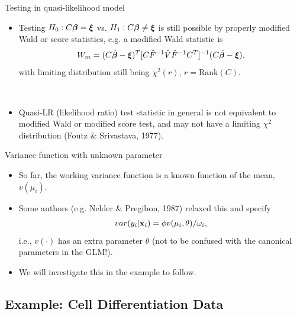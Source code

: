 \documentclass{beamer}
\newcommand{\currentsubsection}{}
\let\oldsubsection\subsection
\renewcommand{\subsection}[1]{\oldsubsection{#1}\renewcommand{\currentsubsection}{#1}}
\newcommand{\boldbeta}{{\boldsymbol \beta}}
\newenvironment{wideitemize}%
  {\begin{itemize}%
    \setlength{\parskip}{1em}}%
  {\end{itemize}}
\begin{document}
\begin{frame} {Testing in  quasi-likelihood model}
\begin{itemize}

\item
Testing $H_0: C\mbox{\boldmath $\beta$}=\mbox{\boldmath $\xi$}$ vs. $H_1:C\mbox{\boldmath $\beta$}
\neq \mbox{\boldmath $\xi$}$ is still possible by properly modified Wald or score statistics, e.g. a modified
Wald statistic is 
$$W_m=(C\hat{\boldbeta}-\mbox{\boldmath $\xi$})^T[C
\hat{F}^{-1}\hat{V}\hat{F}^{-1}C^T]^{-1}
(C\hat{\boldbeta}-\mbox{\boldmath $\xi$}),$$
with limiting distribution still being $\chi^2(r)$, $r=\mbox{Rank}(C)$.

\ \

\item
Quasi-LR (likelihood ratio) test statistic in general is not equivalent to modified Wald or modified
score test, and may not have a limiting $\chi^2$ distribution (Foutz \& Srivastava, 1977).


\end{itemize}


\end{frame}



\begin{frame} {Variance function with unknown parameter}

\begin{wideitemize}
\item So far,  the working variance function is a known function of the mean, $v(\mu_i)$.

\item Some authors (e.g. Nelder \& Pregibon, 1987) relaxed this and specify
\[
var(y_i | {\bf x}_i) = \phi v(\mu_i, \theta)/\omega_i,
\]
i.e., $v(\cdot)$ has an extra  parameter $\theta$ (not to be confused with the canonical parameters in the GLM!). 

\item We will investigate this in the example to follow. 

\end{wideitemize}
\end{frame}


\subsection{Example: Cell Differentiation Data}

%
%
%
%
%
%
%
\end{document}
